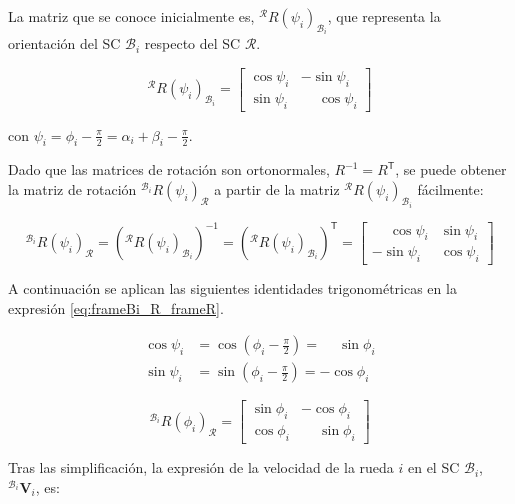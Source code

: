 \documentclass[11pt,a4paper]{article}
\newcommand{\vect}[1]{\bm{#1}}       %
\newcommand{\trans}{\mathsf{T}}      %
\newcommand{\frameR}{\mathcal{R}}
\newcommand{\frameBi}{\mathcal{B}_i}
\begin{document}
La matriz que se conoce inicialmente es, \({}^\frameR R(\psi_i)_{\frameBi}\), que representa la orientación del SC \(\frameBi\) respecto del SC \(\frameR\).

\begin{equation}
    {}^\frameR  R(\psi_i)_{\frameBi} =
    \begin{bmatrix}
        \cos\psi_i & -\sin\psi_i           \\
        \sin\psi_i & \phantom{-}\cos\psi_i
    \end{bmatrix}
\end{equation}

con \(\psi_i = \phi_i - \frac{\pi}{2} = \alpha_i + \beta_i - \frac{\pi}{2}\).

Dado que las matrices de rotación son ortonormales, \(R^{-1} = R^{\trans}\), se puede obtener la matriz de rotación \({}^{\frameBi} R(\psi_i)_{\frameR}\) a partir de la matriz \({}^\frameR  R(\psi_i)_{\frameBi}\) fácilmente:

\begin{equation}
    {}^{\frameBi} R(\psi_i)_{\frameR} = \left({}^\frameR  R(\psi_i)_{\frameBi}\right)^{-1} = \left({}^\frameR  R(\psi_i)_{\frameBi}\right)^{\trans} =
    \begin{bmatrix}
        \phantom{-}\cos\psi_i & \sin\psi_i \\
        -\sin\psi_i           & \cos\psi_i
    \end{bmatrix}
    \label{eq:frameBi_R_frameR}
\end{equation}

A continuación se aplican las siguientes identidades trigonométricas en la expresión \ref{eq:frameBi_R_frameR}.

\[
    \begin{aligned}
        \cos\psi_i & = \cos\left(\phi_i - \frac{\pi}{2}\right) = \phantom{-}\sin\phi_i \\
        \sin\psi_i & = \sin\left(\phi_i - \frac{\pi}{2}\right) = -\cos\phi_i
    \end{aligned}
\]

\begin{equation}
    {}^{\frameBi}  R(\phi_i)_{\frameR} = \begin{bmatrix}
        \sin\phi_i & -\cos\phi_i           \\
        \cos\phi_i & \phantom{-}\sin\phi_i
    \end{bmatrix}
\end{equation}

Tras las simplificación, la expresión de la velocidad de la rueda \(i\) en el SC \(\frameBi\), \({}^{\frameBi} \vect{V}_i\), es:
\end{document}
